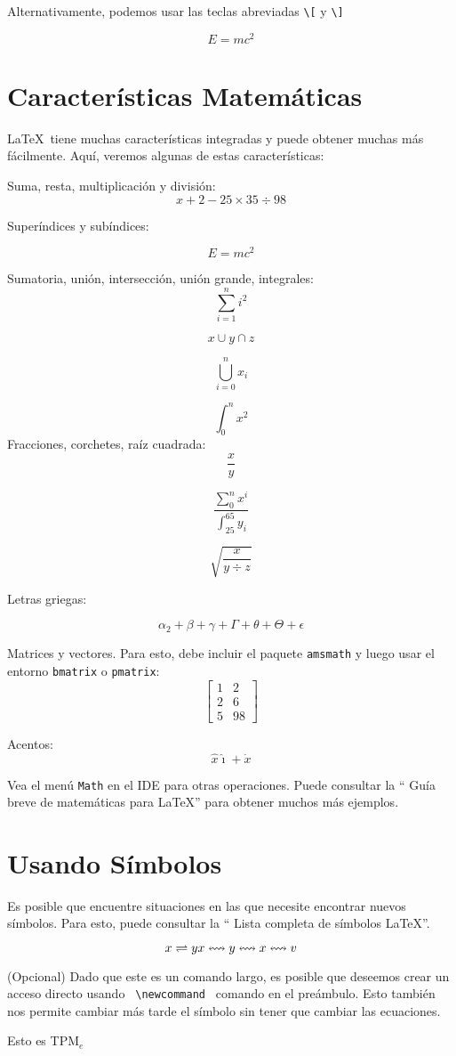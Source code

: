 \documentclass{article}
\newcommand{\flowsinfo}{\leftrightsquigarrow}
\newcommand{\tpme}{TPM$_e$}
\begin{document}
	Alternativamente, podemos usar las teclas abreviadas \verb|\[| y \verb|\]|
	
	\[
	E=mc^2
	\]
	
	\section{Características Matemáticas}
	\LaTeX\ tiene muchas características integradas y puede obtener muchas más fácilmente. Aquí, veremos algunas de estas características:
	
	Suma, resta, multiplicación y división:
	\[
	x + 2 - 25 \times 35 \div 98
	\]
	
	Superíndices y subíndices:
	
	\[
	E = mc^2
	\]
	
	Sumatoria, unión, intersección, unión grande, integrales:
	\[
	\sum_{i=1}^{n} i^2
	\]	
	
	\[
	x \cup y \cap z 
	\]
	
	\[
	\bigcup_{i=0}^n x_i  
	\]
	
	\[
	\int_{0}^{n} x^2
	\]
	Fracciones, corchetes, raíz cuadrada:
	\[
	\frac{x}{y}
	\]
	
	\[
			\frac{
				\sum_0^n x^i
			}{
				\int_{25}^{65} y_i
			}
	\]
	
	\[
	\sqrt{
		\frac{x}{
			y \div z
		}
	}
	\]
	
	Letras griegas:
	
	\[
	\alpha_2 + \beta + \gamma + \Gamma + \theta + \Theta + \epsilon
	\]
	
	
	Matrices y vectores. Para esto, debe incluir el paquete \texttt {amsmath} y luego usar el entorno \texttt {bmatrix} o \texttt {pmatrix}:
	\[
	\begin{bmatrix}
		1   &   2 \\
		2  &  6 \\
		5  &  98
	\end{bmatrix}
	\]
	
	Acentos:
	\[
	\hat{x} \hat {\imath} + \dot{x}
	\]
	
	
	Vea el menú \texttt {Math} en el IDE para otras operaciones. Puede consultar la `` Guía breve de matemáticas para \LaTeX '' para obtener muchos más ejemplos. 
	
	\section{Usando Símbolos} 
	Es posible que encuentre situaciones en las que necesite encontrar nuevos símbolos. Para esto, puede consultar la `` Lista completa de símbolos \LaTeX ''.
	
	\[
	x  \rightleftharpoons y \\
	x  \flowsinfo y \flowsinfo x \flowsinfo v
	\]
		
	(Opcional) Dado que este es un comando largo, es posible que deseemos crear un acceso directo usando \verb| \newcommand | comando en el preámbulo. Esto también nos permite cambiar más tarde el símbolo sin tener que cambiar las ecuaciones.
	
	Esto es \tpme
	
	
\end{document}
